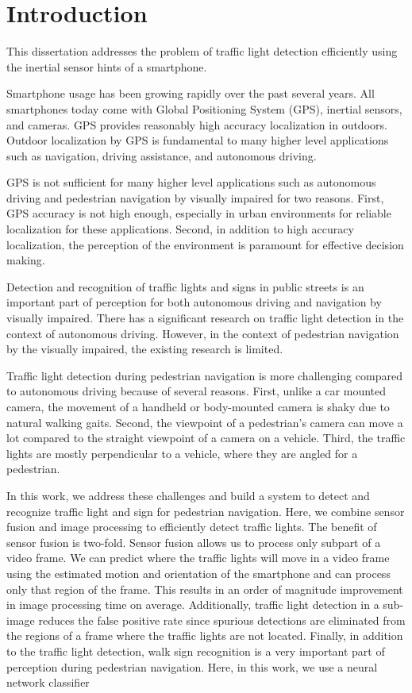 \chapter{Introduction}

This dissertation addresses the problem of traffic light detection efficiently using the inertial sensor hints of a smartphone.

Smartphone usage has been growing rapidly over the past several years. 
All smartphones today come with Global Positioning System (GPS), inertial sensors, and cameras. 
GPS provides reasonably high accuracy localization in outdoors. 
Outdoor localization by GPS is fundamental to many higher level applications such as navigation, driving assistance, and autonomous driving.

GPS is not sufficient for many higher level applications such as autonomous driving and pedestrian navigation by visually impaired for two reasons.
First, GPS accuracy is not high enough, especially in urban environments for reliable localization for these applications. 
Second, in addition to high accuracy localization, the perception of the environment is paramount for effective decision making. 

Detection and recognition of traffic lights and signs in public streets is an important part of perception for both autonomous driving and navigation by visually impaired.  
There has a significant research \cite{traffic_google} on traffic light detection in the context of autonomous driving. 
However, in the context of pedestrian navigation by the visually impaired, the existing research is limited. 

Traffic light detection during pedestrian navigation is more challenging compared to autonomous driving because of several reasons. 
First, unlike a car mounted camera, the movement of a handheld or body-mounted camera is shaky due to natural walking gaits. 
Second, the viewpoint of a pedestrian's camera can move a lot compared to the straight viewpoint of a camera on a vehicle.
Third, the traffic lights are mostly perpendicular to a vehicle, where they are angled for a pedestrian. 

In this work, we address these challenges and build a system to detect and recognize traffic light and sign for pedestrian navigation.
Here, we combine sensor fusion and image processing to efficiently detect traffic lights. 
The benefit of sensor fusion is two-fold.
Sensor fusion allows us to process only subpart of a video frame.
We can predict where the traffic lights will move in a video frame using the estimated motion and orientation of the smartphone and can process only that region of the frame. 
This results in an order of magnitude improvement in image processing time on average. 
Additionally, traffic light detection in a sub-image reduces the false positive rate since spurious detections are eliminated from the regions of a frame where the traffic lights are not located.
Finally, in addition to the traffic light detection, walk sign recognition is a very important part of perception during pedestrian navigation.
\note{}Here, in this work, we use a neural network classifier

